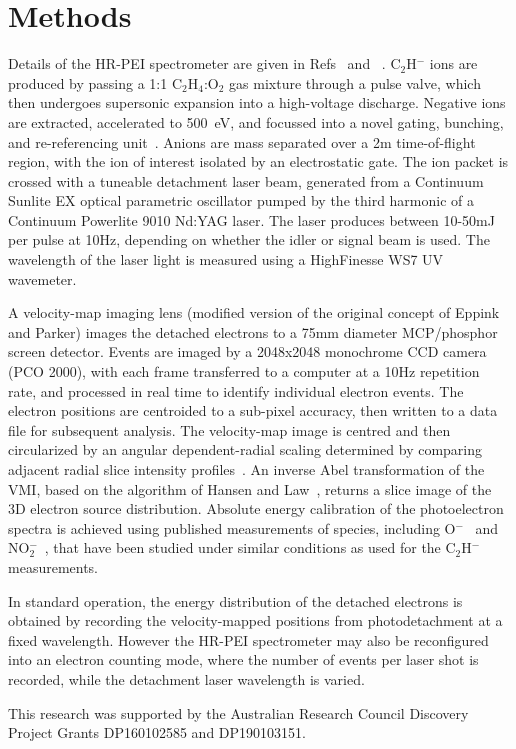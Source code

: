 \documentclass[journal=jpcafh,manuscript=article,layout=onecolumn, 12pt]{achemso}
\newcommand{\onlinecite}[1]{\hspace{-1 ex} \nocite{#1}\citenum{#1}}
\begin{document}
\section{Methods}
Details of the HR-PEI spectrometer are given in Refs~\onlinecite{cav07} and~\onlinecite{dev17}. C$_2$H$^-$ ions are produced by passing a 1:1 C$_2$H$_4$:O$_2$ gas mixture through a pulse valve, which then undergoes supersonic expansion into a high-voltage discharge. Negative ions are extracted, accelerated to 500~eV, and focussed into a novel gating, bunching, and re-referencing unit~\cite{ded01}. Anions are mass separated over a 2m time-of-flight region, with the ion of interest isolated by an electrostatic gate. The ion packet is crossed with a tuneable detachment laser beam, generated from a Continuum Sunlite EX optical parametric oscillator pumped by the third harmonic of a Continuum Powerlite 9010 Nd:YAG laser. The laser produces between 10-50mJ per pulse at 10Hz, depending on whether the idler or signal beam is used. The wavelength of the laser light is measured using a HighFinesse WS7 UV wavemeter.

A velocity-map imaging lens (modified version of the original concept of Eppink and Parker) images the detached electrons to a 75mm diameter MCP/phosphor screen detector. Events are imaged by a 2048x2048 monochrome CCD camera (PCO 2000), with each frame transferred to a computer at a 10Hz repetition rate, and processed in real time to identify individual electron events. The electron positions are centroided to a sub-pixel accuracy, then written to a data file for subsequent analysis. The velocity-map image is centred and then circularized by an angular dependent-radial scaling determined by comparing adjacent radial slice intensity profiles~\cite{gas17}. An inverse Abel transformation of the VMI, based on the algorithm of Hansen and Law~\cite{han85,hic19}, returns a slice image of the 3D electron source distribution. Absolute energy calibration of the photoelectron spectra is achieved using published measurements of species, including O$^-$~\cite{cav07} and NO$_2^-$~\cite{law19}, that have been studied under similar conditions as used for the C$_2$H$^-$ measurements.

In standard operation, the energy distribution of the detached electrons is obtained by recording the velocity-mapped positions from photodetachment at a fixed wavelength. However the HR-PEI spectrometer may also be reconfigured into an electron counting mode, where the number of events per laser shot is recorded, while the detachment laser wavelength is varied.








\begin{acknowledgement}
	This research was supported by the Australian Research Council Discovery
	Project Grants DP160102585 and DP190103151.  
\end{acknowledgement}


\end{document}
